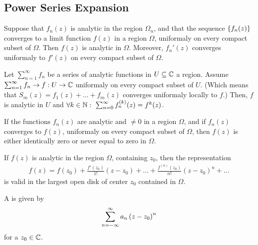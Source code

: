 \subsection{Power Series Expansion}

\begin{theorem}[Weierstrass]
    Suppose that $f_n(z)$ is analytic in the region $\Omega_n$, and that the
    sequence $\left\{ f_n(z) \right\}$ converges to a limit function $f(z)$ in a
    region $\Omega$, uniformaly on every compact subset of $\Omega$. Then $f(z)$ is
    analytic in $\Omega$. Moreover, $f_n' (z)$ converges uniformaly to $f'(z)$ on
    every compact subset of $\Omega$.
\end{theorem}

\begin{corollary}
    Let $\sum_{n=1}^\infty f_n$ be a series of analytic functions in $U \subseteq \mathbb{C}$
    a region. Assume $\sum_{n=1}^\infty f_n \rightarrow f: U \rightarrow \mathbb{C}$ uniformaly
    on every compact subset of $U$. (Which means that $S_m (z) = f_1(z) + \dots + f_m(z)$
    converges uniformaly locally to $f$.) Then, $f$ is analytic in $U$ and $\forall k
    \in \mathbb{N} : \ \sum_{n=0}^\infty f_n^{(k)} (z) = f^{k} (z)$.
\end{corollary}

\begin{theorem}
    If the functions $f_n(z)$ are analytic and $\neq 0$ in a region $\Omega$, and
    if $f_n(z)$ converges to $f(z)$, uniformaly on every compact subset of $\Omega$,
    then $f(z)$ is either identically zero or never equal to zero in $\Omega$. 
\end{theorem}

\begin{theorem}[Taylor]
    If $f(z)$ is analytic in the region $\Omega$, containing $z_0$, then the
    representation
    \begin{align*}
        f(z) = f(z_0) + \frac{f'(z_0)}{1!} (z-z_0) + \dots + \frac{f^{(n)}(z_0)}{n!} (z-z_0)^n + \dots
    \end{align*}
    is valid in the largest open disk of center $z_0$ contained in $\Omega$.
\end{theorem}

\begin{definition}
    A  is given by
    \begin{align*}
        \sum_{n=-\infty}^\infty a_n \left( z-z_0 \right)^n
    \end{align*}
    for a $z_0 \in \mathbb{C}$.
\end{definition}

